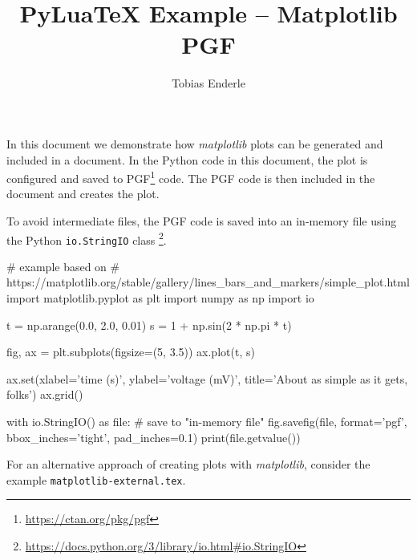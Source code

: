 \documentclass{article}
\title{PyLuaTeX Example -- Matplotlib PGF}
\author{Tobias Enderle}
\begin{document}
\maketitle

In this document we demonstrate how \emph{matplotlib} plots can be generated and
included in a document. In the Python code in this document, the plot is
configured and saved to PGF\footnote{\url{https://ctan.org/pkg/pgf}} code.
The PGF code is then included in the document and creates the plot.

To avoid intermediate files, the PGF code is saved into an in-memory file
using the Python \verb|io.StringIO| class%
\footnote{\url{https://docs.python.org/3/library/io.html#io.StringIO}}.

\begin{center}
\begin{python}
# example based on
# https://matplotlib.org/stable/gallery/lines_bars_and_markers/simple_plot.html
import matplotlib.pyplot as plt
import numpy as np
import io

t = np.arange(0.0, 2.0, 0.01)
s = 1 + np.sin(2 * np.pi * t)

fig, ax = plt.subplots(figsize=(5, 3.5))
ax.plot(t, s)

ax.set(xlabel='time (s)', ylabel='voltage (mV)',
       title='About as simple as it gets, folks')
ax.grid()

with io.StringIO() as file:  # save to "in-memory file"
    fig.savefig(file, format='pgf', bbox_inches='tight', pad_inches=0.1)
    print(file.getvalue())
\end{python}
\end{center}

For an alternative approach of creating plots with \emph{matplotlib},
consider the example \verb|matplotlib-external.tex|.
\end{document}
